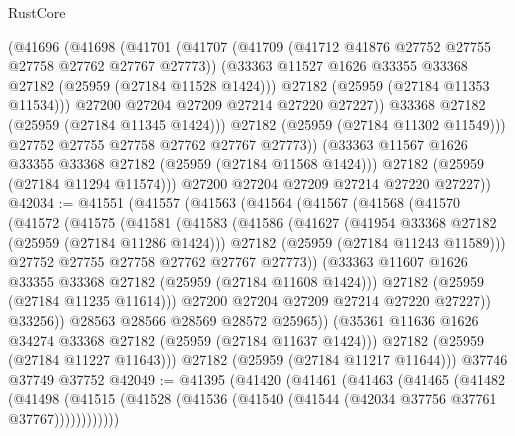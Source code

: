 \begin{lexlean}{RustCore}
\begin{coremodule}
                (@41696
                  (@41698
                    (@41701
                      (@41707
                        (@41709 (@41712 @41876 @27752 @27755 @27758 @27762 @27767 @27773))
                        (@33363 @11527 @1626 @33355 @33368 @27182 (@25959 (@27184 @11528 @1424)))
                        @27182
                        (@25959 (@27184 @11353 @11534)))
                      @27200
                      @27204
                      @27209
                      @27214
                      @27220
                      @27227))
                  @33368
                  @27182
                  (@25959 (@27184 @11345 @1424)))
                @27182
                (@25959 (@27184 @11302 @11549)))
              @27752
              @27755
              @27758
              @27762
              @27767
              @27773))
          (@33363 @11567 @1626 @33355 @33368 @27182 (@25959 (@27184 @11568 @1424)))
          @27182
          (@25959 (@27184 @11294 @11574)))
        @27200
        @27204
        @27209
        @27214
        @27220
        @27227))
@42034 := @41551
    (@41557
      (@41563
        (@41564
          (@41567
            (@41568
              (@41570
                (@41572
                  (@41575
                    (@41581
                      (@41583
                        (@41586
                          (@41627
                            (@41954 @33368 @27182 (@25959 (@27184 @11286 @1424)))
                            @27182
                            (@25959 (@27184 @11243 @11589)))
                          @27752
                          @27755
                          @27758
                          @27762
                          @27767
                          @27773))
                      (@33363 @11607 @1626 @33355 @33368 @27182 (@25959 (@27184 @11608 @1424)))
                      @27182
                      (@25959 (@27184 @11235 @11614)))
                    @27200
                    @27204
                    @27209
                    @27214
                    @27220
                    @27227))
                @33256))
            @28563
            @28566
            @28569
            @28572
            @25965))
        (@35361 @11636 @1626 @34274 @33368 @27182 (@25959 (@27184 @11637 @1424)))
        @27182
        (@25959 (@27184 @11227 @11643)))
      @27182
      (@25959 (@27184 @11217 @11644)))
    @37746
    @37749
    @37752
@42049 := @41395
    (@41420
      (@41461
        (@41463
          (@41465
            (@41482
              (@41498
                (@41515 (@41528 (@41536 (@41540 (@41544 (@42034 @37756 @37761 @37767))))))))))))

\end{coremodule}
\end{lexlean}
